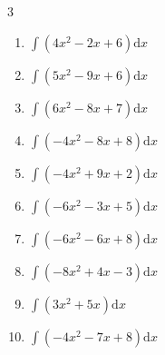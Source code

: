 \begin{multicols}{3}
\begin{enumerate}
  \item $\displaystyle \int \left( 4x^{2}-2x+6 \right) \mathrm{d}x$


\columnbreak %

  \item $\displaystyle \int \left( 5x^{2}-9x+6 \right) \mathrm{d}x$


  \item $\displaystyle \int \left( 6x^{2}-8x+7 \right) \mathrm{d}x$


  \item $\displaystyle \int \left( -4x^{2}-8x+8 \right) \mathrm{d}x$


  \item $\displaystyle \int \left( -4x^{2}+9x+2 \right) \mathrm{d}x$


  \item $\displaystyle \int \left( -6x^{2}-3x+5 \right) \mathrm{d}x$


  \item $\displaystyle \int \left( -6x^{2}-6x+8 \right) \mathrm{d}x$


  \item $\displaystyle \int \left( -8x^{2}+4x-3 \right) \mathrm{d}x$


  \item $\displaystyle \int \left( 3x^{2}+5x \right) \mathrm{d}x$


  \item $\displaystyle \int \left( -4x^{2}-7x+8 \right) \mathrm{d}x$



\end{enumerate}
\end{multicols}
